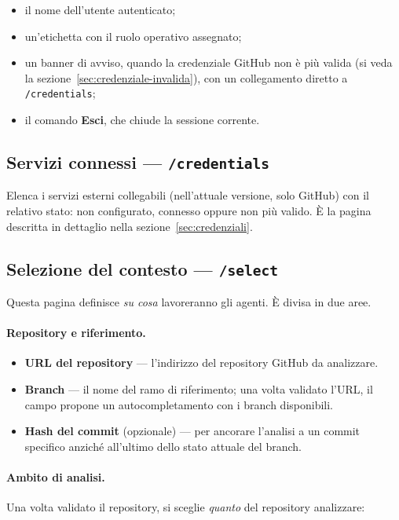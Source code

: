 \documentclass[11pt,a4paper]{article}
\newcommand{\route}[1]{\texttt{#1}}
\begin{document}
\begin{itemize}
  \item il nome dell'utente autenticato;
  \item un'etichetta con il ruolo operativo assegnato;
  \item un banner di avviso, quando la credenziale GitHub non è più valida (si veda la
        sezione~\ref{sec:credenziale-invalida}), con un collegamento diretto a
        \route{/credentials};
  \item il comando \textbf{Esci}, che chiude la sessione corrente.
\end{itemize}

\subsection{Servizi connessi --- \texttt{/credentials}}

Elenca i servizi esterni collegabili (nell'attuale versione, solo GitHub) con il relativo
stato: non configurato, connesso oppure non più valido. È la pagina descritta in
dettaglio nella sezione~\ref{sec:credenziali}.

\subsection{Selezione del contesto --- \texttt{/select}}
\label{sec:select}

Questa pagina definisce \emph{su cosa} lavoreranno gli agenti. È divisa in due aree.

\paragraph{Repository e riferimento.}
\begin{itemize}
  \item \textbf{URL del repository} --- l'indirizzo del repository GitHub da analizzare.
  \item \textbf{Branch} --- il nome del ramo di riferimento; una volta validato l'URL,
        il campo propone un autocompletamento con i branch disponibili.
  \item \textbf{Hash del commit} (opzionale) --- per ancorare l'analisi a un commit
        specifico anziché all'ultimo dello stato attuale del branch.
\end{itemize}

\paragraph{Ambito di analisi.}
Una volta validato il repository, si sceglie \emph{quanto} del repository analizzare:
\end{document}
